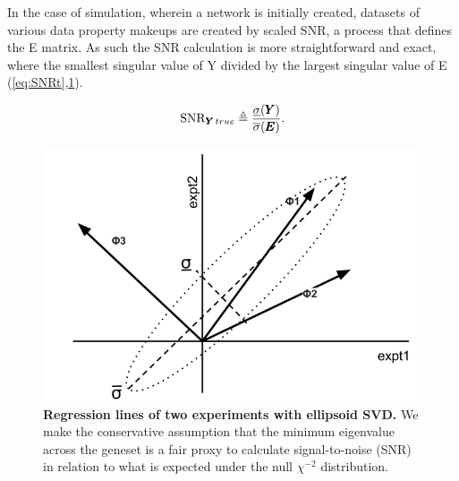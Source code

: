In the case of simulation, wherein a network is initially created, datasets of various data property makeups are created by scaled SNR, a process that defines the E matrix. As such the SNR calculation is more straightforward and exact, where the smallest singular value of Y divided by the largest singular value of E (\cref{eq:SNRt},\cref{fig:SNR}).

\begin{equation}
    \operatorname{SNR}_{{\pmb{Y}}\,true} \triangleq \frac{\underline{\sigma}({\pmb{Y}})}{\overline{\sigma}({\pmb{E}})}.
  \label{eq:SNRt}
\end{equation} 

\begin{figure}[H]
  \begin{center}
    \includegraphics[width=1\linewidth]{4/matrixSNR.png}
  \end{center}
  \caption{\textbf{Regression lines of two experiments with ellipsoid SVD.} We make the conservative assumption that the minimum eigenvalue across the geneset is a fair proxy to calculate signal-to-noise (SNR) in relation to what is expected under the null $\chi^{-2}$ distribution.}
  \label{fig:SNR}
\end{figure}

